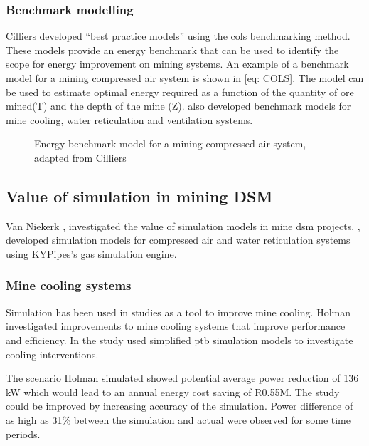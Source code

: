 		\subsubsection{Benchmark modelling}
		 Cilliers \cite{Cilliers2015PHD} developed \enquote{best practice models} using the \gls{cols} benchmarking method. These models provide an energy benchmark that can be used to identify the scope for energy improvement on mining systems. An example of a benchmark model for a mining compressed air system is shown in \cref{eq: COLS}. The model can be used to estimate optimal energy required as a function of the quantity of ore mined(T) and the depth of the mine (Z). \cite{Cilliers2015PHD} also developed benchmark models for mine cooling, water reticulation and ventilation systems.
		\begin{figure}[h!]
			\centering
			\fbox{\hspace{2cm}\hspace{2cm}}
			\caption[Energy benchmark model for a mining compressed air system]{Energy benchmark model for a mining compressed air system, adapted from Cilliers \cite{Cilliers2015PHD}}
			\label{fig: 3D Benchmark}
		\end{figure}
	\subsection{Value of simulation in mining DSM}
	Van Niekerk \cite{van2013value},\cite{vanNiekerk2012Value} investigated the value of simulation models in mine \gls{dsm} projects. \cite{van2013value},\cite{vanNiekerk2012Value} developed simulation models for compressed air and water reticulation systems using KYPipes's gas simulation engine. 
	\subsubsection{Mine cooling systems}
	Simulation has been used in studies as a tool to improve mine cooling. Holman \cite{Holman2014Masters} investigated improvements to mine cooling systems that improve performance and efficiency. In the study \cite{Holman2014Masters} used simplified \gls{ptb}  simulation models to investigate cooling interventions.
	\par 
	The scenario Holman simulated showed potential  average power reduction of 136 kW  which would lead to an annual energy cost saving of R0.55M. The study could be improved by increasing accuracy of the simulation. Power difference of as high as 31\% between the simulation and actual were observed for some time periods.
	
